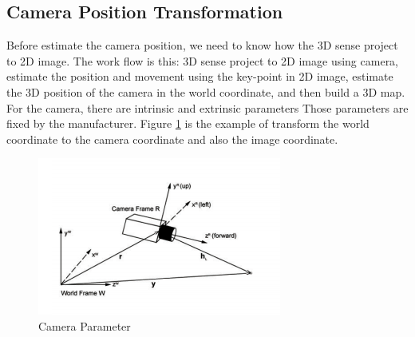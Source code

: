 \documentclass[10pt, conference, compsocconf]{IEEEtran}
\begin{document}
\subsection{Camera Position Transformation}
Before estimate the camera position, we need to know how the 3D sense project to 2D image. The work flow is this: 3D sense project to 2D image using camera, estimate the position and movement using the key-point in 2D image, estimate the 3D position of the camera in the world coordinate, and then build a 3D map. \\
For the camera, there are intrinsic and extrinsic parameters Those parameters are fixed by the manufacturer. Figure \ref{fig:camera} is the example of transform the world coordinate to the camera coordinate and also the image coordinate.
\begin{figure}[h]
	\centering
	\includegraphics[scale = 0.60]{image/camera.png}
	\caption{Camera Parameter}
	\label{fig:camera}
\end{figure}
\end{document}
